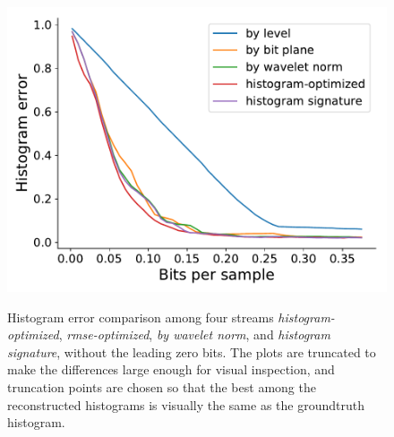 \begin{figure}[h]
	{\includegraphics[width=0.48\linewidth]{img/histogram/histogram-optimized-velocityz.pdf}}
	\caption{Histogram error comparison among four streams \emph{histogram-optimized},
	\emph{rmse-optimized}, \emph{by wavelet norm}, and \emph{histogram signature}, without the leading
	zero bits. The plots are truncated to make the differences large enough for visual inspection, and
	truncation points are chosen so that the best among the reconstructed histograms is visually the
	same as the groundtruth histogram. }
	\label{fig:histogram-stream-comparison}
\end{figure}

